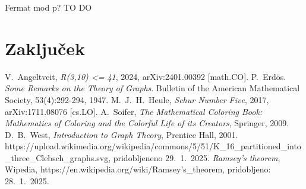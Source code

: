\documentclass[twoside,11pt]{article}
\begin{document}
\begin{izrek}
    Fermat mod p? TO DO
\end{izrek}

\section{Zaključek}

\begin{thebibliography}{99}
     V.~Angeltveit, \emph{R(3,10) <= 41}, 2024, arXiv:2401.00392 [math.CO].
     P.~Erdös. \emph{Some Remarks on the Theory of Graphs}. Bulletin of the
    American Mathematical Society, 53(4):292-294, 1947.
     M.~J.~H.~Heule, \emph{Schur Number Five}, 2017, arXiv:1711.08076 [cs.LO].
     A.~Soifer, \emph{The Mathematical Coloring Book: Mathematics of Coloring and the Colorful Life of its Creators},
    Springer, 2009.
     D.~B.~West, \emph{Introduction to Graph Theory}, Prentice Hall, 2001.
     https://upload.wikimedia.org/wikipedia/commons/5/51/K\_16\_partitioned\_into\_three\_Clebsch\_graphs.svg, pridobljeneno 29.~1.~2025.
     \emph{Ramsey's theorem}, Wipedia, https://en.wikipedia.org/wiki/Ramsey's\_theorem, pridobljeno: 28.~1.~2025.
\end{thebibliography}
\end{document}
